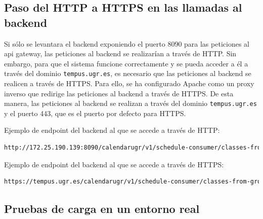 \subsection{Paso del HTTP a HTTPS en las llamadas al backend}
Si sólo se levantara el backend exponiendo el puerto 8090 para las peticiones al api gateway, las peticiones al backend se realizarían a través de HTTP. Sin embargo, para que el sistema funcione correctamente y se pueda acceder a él a través del dominio \texttt{tempus.ugr.es}, es necesario que las peticiones al backend se realicen a través de HTTPS.
Para ello, se ha configurado Apache como un proxy inverso que redirige las peticiones al backend a través de HTTPS. De esta manera, las peticiones al backend se realizan a través del dominio \texttt{tempus.ugr.es} y el puerto 443, que es el puerto por defecto para HTTPS.

Ejemplo de endpoint del backend al que se accede a través de HTTP:

\lstset{inputencoding=utf8}
\begin{lstlisting}[language=bash]
http://172.25.190.139:8090/calendarugr/v1/schedule-consumer/classes-from-group
\end{lstlisting}

Ejemplo de endpoint del backend al que se accede a través de HTTPS:

\lstset{inputencoding=utf8}
\begin{lstlisting}[language=bash]
https://tempus.ugr.es/calendarugr/v1/schedule-consumer/classes-from-group
\end{lstlisting}

\subsection{Pruebas de carga en un entorno real}

